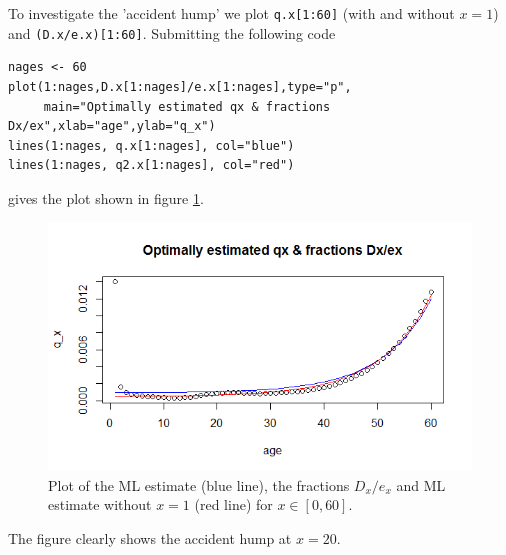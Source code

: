 To investigate the 'accident hump' we plot \verb+q.x[1:60]+ (with and without $x=1$) and \verb+(D.x/e.x)[1:60]+. Submitting the following code

\begin{verbatim}
nages <- 60
plot(1:nages,D.x[1:nages]/e.x[1:nages],type="p",
     main="Optimally estimated qx & fractions Dx/ex",xlab="age",ylab="q_x")
lines(1:nages, q.x[1:nages], col="blue")
lines(1:nages, q2.x[1:nages], col="red")
\end{verbatim}

gives the plot shown in figure \ref{Figure_Question9_3}.
\begin{center}
\begin{figure}
\includegraphics[scale=1]{Question_9_MakehamGompertz_3.png}
\caption{Plot of the ML estimate (blue line), the fractions $D_x/e_x$ and ML estimate without $x=1$ (red line) for $ x \in [0,60]$.}
\label{Figure_Question9_3}
\end{figure}
\end{center}		

The figure clearly shows the accident hump at $x=20$. 

